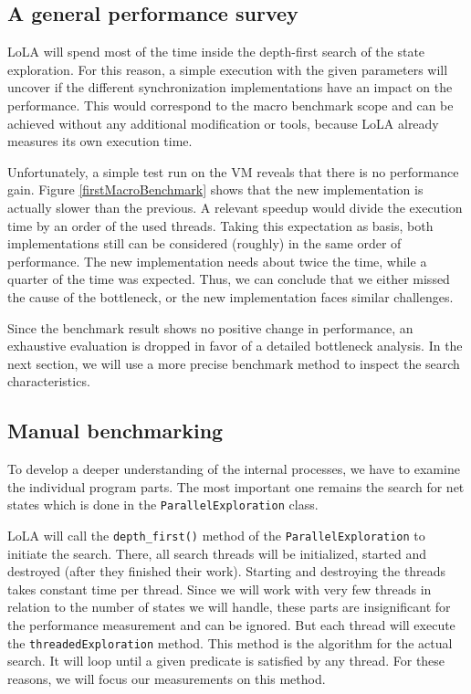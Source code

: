 \subsection{A general performance survey}
LoLA will spend most of the time inside the depth-first search of the state exploration. For this reason, a simple execution with the given parameters will uncover if the different synchronization implementations have an impact on the performance. This would correspond to the macro benchmark scope and can be achieved without any additional modification or tools, because LoLA already measures its own execution time.

Unfortunately, a simple test run on the VM reveals that there is no performance gain. Figure \ref{firstMacroBenchmark} shows that the new implementation is actually slower than the previous. A relevant speedup would divide the execution time by an order of the used threads. Taking this expectation as basis, both implementations still can be considered (roughly) in the same order of performance. The new implementation needs about twice the time, while a quarter of the time was expected. Thus, we can conclude that we either missed the cause of the bottleneck, or the new implementation faces similar challenges.



Since the benchmark result shows no positive change in performance, an exhaustive evaluation is dropped in favor of a detailed bottleneck analysis. In the next section, we will use a more precise benchmark method to inspect the search characteristics.

\subsection{Manual benchmarking}
To develop a deeper understanding of the internal processes, we have to examine the individual program parts. The most important one remains the search for net states which is done in the \texttt{ParallelExploration} class.

LoLA will call the \texttt{depth\_first()} method of the \texttt{ParallelExploration} to initiate the search. There, all search threads will be initialized, started and destroyed (after they finished their work). Starting and destroying the threads takes constant time per thread. Since we will work with very few threads in relation to the number of states we will handle, these parts are insignificant for the performance measurement and can be ignored. But each thread will execute the \texttt{threadedExploration} method. This method is the algorithm for the actual search. It will loop until a given predicate is satisfied by any thread. For these reasons, we will focus our measurements on this method.

